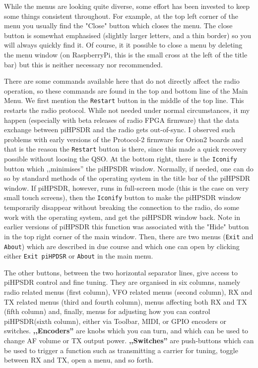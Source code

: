 \documentclass[12pt]{book}
\def\rett#1{\texttt{\color{red}#1}}
\def\bltt#1{\texttt{\color{blue}#1}}
\def\pH{pi\-HPSDR\xspace}
\begin{document}
While the menus are looking quite diverse, some effort has been invested to keep
some things consistent throughout. For example, at the top left corner of the menu
you usually find the "Close" button which closes the menu. The close button is somewhat
emphasised (slightly larger letters, and a thin border) so you will always quickly find it.
Of course, it it possible to close a menu by deleting the menu window (on RaspberryPi,
this is the small cross at the left of the title bar) but this is neither necessary nor
recommended.

There are some commands available here that do not directly affect the radio operation,
so these commands are found in the top and bottom line of the Main Menu. We first
mention the \rett{Restart} button in the middle of the top line. This restarts the
radio protocol. While not needed under normal circumstances, it my happen (especially
with beta releases of radio FPGA firmware) that the data exchange between \pH and
the radio gets out-of-sync. I observed such problems with early versions of the Protocol-2
firmware for Orion2 boards and that is the reason the \rett{Restart} button is
there, since this made a quick recovery possible without loosing the QSO.
At the bottom right, there is the \rett{Iconify} button which ,,minimises'' the
\pH window. Normally, if needed, one can do so by standard methods of the
operating system in the title bar of the \pH window. If \pH, however,
runs in full-screen mode (this is the case on very small touch screens), then the
\rett{Iconify} button to make the \pH window temporarily disappear without
breaking the connection to the radio, do some work with the operating system, and
get the \pH window back. Note in earlier versions of \pH this function was
associated with the "Hide" button in the top right corner of the main window.
Then, there are two menus (\bltt{Exit} and \bltt{About}) which are described in due course and which
one can open by clicking either \rett{Exit piHPDSR} or \rett{About} in the main menu.

The other buttons, between the two horizontal separator lines, give access to \pH
control and fine tuning. They are organised in six columns, namely radio related
menus (first column), VFO related menus (second column), RX and TX related menus (third
and fourth column), menus affecting both RX and TX (fifth column) and, finally,
menus for adjusting how you can control \pH (sixth column), either via Toolbar,
MIDI, or GPIO encoders or switches. \textbf{,,Encoders''} are knobs which you can turn, and which
can be used to change AF volume or TX output power. \textbf{,,Switches''} are push-buttons which
can be used to trigger a function such as transmitting a carrier for tuning, toggle
between RX and TX, open a menu, and so forth.
\end{document}
